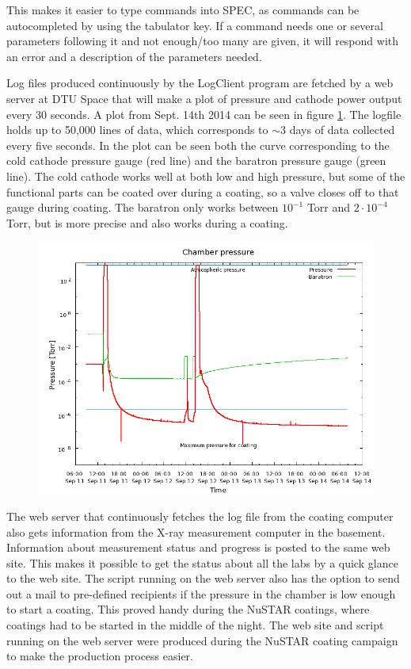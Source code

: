 This makes it easier to type commands into SPEC, as commands can be autocompleted by using the tabulator key. If a command needs one or several parameters following it and not enough/too many are given, it will respond with an error and a description of the parameters needed.

Log files produced continuously by the LogClient program are fetched by a web server at DTU Space that will make a plot of pressure and cathode power output every 30 seconds. A plot from Sept. 14th 2014 can be seen in figure \ref{fig:chamber_pressure}. The logfile holds up to 50,000 lines of data, which corresponds to $\sim$3 days of data collected every five seconds. In the plot can be seen both the curve corresponding to the cold cathode pressure gauge (red line) and the baratron pressure gauge (green line). The cold cathode works well at both low and high pressure, but some of the functional parts can be coated over during a coating, so a valve closes off to that gauge during coating. The baratron only works between $10^{-1}$ Torr and $2\cdot10^{-4}$ Torr, but is more precise and also works during a coating.

\begin{figure}[htbp]
  \centering
    \includegraphics[width=0.8\linewidth]{figures/chamber/pressure.png}
  \caption{\footnotesize }
  \label{fig:chamber_pressure}
\end{figure}

The web server that continuously fetches the log file from the coating computer also gets information from the X-ray measurement computer in the basement. Information about measurement status and progress is posted to the same web site. This makes it possible to get the status about all the labs by a quick glance to the web site. The script running on the web server also has the option to send out a mail to pre-defined recipients if the pressure in the chamber is low enough to start a coating. This proved handy during the NuSTAR coatings, where coatings had to be started in the middle of the night. The web site and script running on the web server were produced during the NuSTAR coating campaign to make the production process easier.

